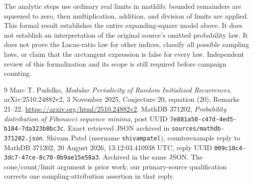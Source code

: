 \documentclass[11pt]{article}
\begin{document}
The analytic steps use ordinary real limits in mathlib: bounded remainders are squeezed to zero, then multiplication, addition, and division of limits are applied. This formal result establishes the entire expanding-square model above. It does not establish an interpretation of the original source's omitted probability law. It does not prove the Lucas-ratio law for other indices, classify all possible sampling laws, or claim that the arctangent expression is false for every law. Independent review of this formalization and its scope is still required before campaign counting.

\begin{thebibliography}{9}
 Marc T. Pudelko, \emph{Modular Periodicity of Random Initialized Recurrences}, arXiv:2510.24882v2, 3 November 2025, Conjecture 20, equation (20), Remarks 21--22. \url{https://arxiv.org/html/2510.24882v2}.
 MathDB 371202, \emph{Probability distribution of Fibonacci sequence minima}, post UUID \texttt{7e881a50-c47d-4ed5-b184-7da323b8bc3c}. Exact retrieved JSON archived in \texttt{sources/mathdb-371202.json}.
 Shivam Patel (username \texttt{shivampatel}), counterexample reply to MathDB 371202, 20 August 2026, 13:12:03.410938 UTC, reply UUID \texttt{009c10c4-3dc7-47ce-8c70-0b9ae15e58a3}. Archived in the same JSON. The cone/count/limit argument is prior work; our primary-source qualification corrects one sampling-attribution assertion in that reply.
\end{thebibliography}
\end{document}
